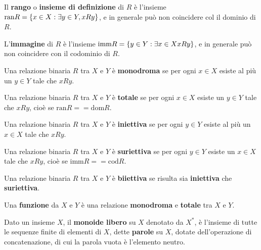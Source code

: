 \documentclass[\main/main.tex]{subfiles}
\begin{document}
\begin{multicols}{2}
\begin{definition}
    \end{definition}
    \begin{definition}
        Il \textbf{rango} o \textbf{insieme di definizione} di \(R\) è l'insieme \(\text{ran} R = \left\{x \in X: \exists y \in Y, x R y\right\}\), e in generale può non coincidere col il dominio di \(R\).
    \end{definition}
    \begin{definition}
        L'\textbf{immagine} di \(R\) è l'insieme \(\text{imm} R = \left\{y \in Y: \exists x \in X x R y\right\}\), e in generale può non coincidere con il codominio di \(R\).
    \end{definition}
    \begin{definition}
        Una relazione binaria \(R\) tra \(X\) e \(Y\) è \textbf{monodroma} se per ogni \(x \in X\) esiste al più un \(y \in Y\) tale che \(x R y\).
    \end{definition}
    \begin{definition}
        Una relazione binaria \(R\) tra \(X\) e \(Y\) è \textbf{totale} se per ogni \(x \in X\) esiste un \(y \in Y\) tale che \(x R y\), cioè se \(\text{ran} R == \text{dom} R\).
    \end{definition}
    \begin{definition}
        Una relazione binaria \(R\) tra \(X\) e \(Y\) è \textbf{iniettiva} se per ogni \(y \in Y\) esiste al più un \(x \in X\) tale che \(x R y\).
    \end{definition}
    \begin{definition}
        Una relazione binaria \(R\) tra \(X\) e \(Y\) è \textbf{suriettiva} se per ogni \(y \in Y\) esiste un \(x \in X\) tale che \(x R y\), cioè se \(\text{imm} R == \text{cod} R\).
    \end{definition}
    \begin{definition}
        Una relazione binaria \(R\) tra \(X\) e \(Y\) è \textbf{biiettiva} se risulta sia \textbf{iniettiva} che \textbf{suriettiva}.
    \end{definition}
    \begin{definition}
        Una \textbf{funzione} da \(X\) e \(Y\) è una relazione \textbf{monodroma} e \textbf{totale} tra \(X\) e \(Y\).
    \end{definition}
    \begin{definition}
        Dato un insieme \(X\), il \textbf{monoide libero} su \(X\) denotato da \(X^*\), è l'insieme di tutte le sequenze finite di elementi di \(X\), dette \textbf{parole} su \(X\), dotate dell'operazione di concatenazione, di cui la parola vuota è l'elemento neutro. 
        

\end{definition}
\end{multicols}
\end{document}
